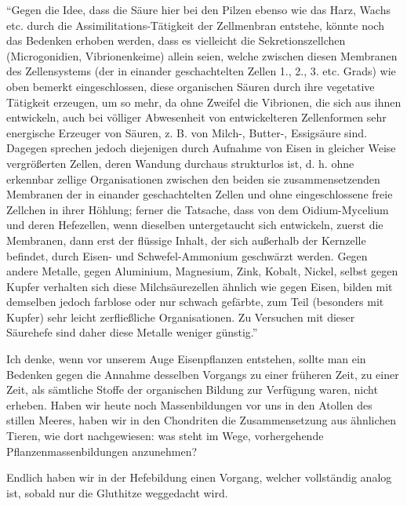 \documentclass[a4paper, 12pt, oneside]{article}
\begin{document}
"`Gegen die Idee, dass die Säure hier bei den Pilzen ebenso wie das Harz, Wachs etc. durch die Assimilitations-Tätigkeit der Zellmenbran entstehe, könnte noch das Bedenken erhoben werden, dass es vielleicht die Sekretionszellchen (Microgonidien, Vibrionenkeime) allein seien, welche zwischen diesen Membranen des Zellensystems (der in einander geschachtelten Zellen 1., 2., 3. etc. Grads) wie oben bemerkt eingeschlossen, diese organischen Säuren durch ihre vegetative Tätigkeit erzeugen, um so mehr, da ohne Zweifel die Vibrionen, die sich aus ihnen entwickeln, auch bei völliger Abwesenheit von entwickelteren Zellenformen sehr energische Erzeuger von Säuren, z. B. von Milch-, Butter-, Essigsäure sind. Dagegen sprechen jedoch diejenigen durch Aufnahme von Eisen in gleicher Weise vergrößerten Zellen, deren Wandung durchaus strukturlos ist, d. h. ohne erkennbar zellige Organisationen zwischen den beiden sie zusammensetzenden Membranen der in einander geschachtelten Zellen und ohne eingeschlossene freie Zellchen in ihrer Höhlung; ferner die Tatsache, dass von dem Oidium-Mycelium und deren Hefezellen, wenn dieselben untergetaucht sich entwickeln, zuerst die Membranen, dann erst der flüssige Inhalt, der sich außerhalb der Kernzelle befindet, durch Eisen- und Schwefel-Ammonium geschwärzt werden. Gegen andere Metalle, gegen Aluminium, Magnesium, Zink, Kobalt, Nickel, selbst gegen Kupfer verhalten sich diese Milchsäurezellen ähnlich wie gegen Eisen, bilden mit demselben jedoch farblose oder nur schwach gefärbte, zum Teil (besonders mit Kupfer) sehr leicht zerfließliche Organisationen. Zu Versuchen mit dieser Säurehefe sind daher diese Metalle weniger günstig."'

Ich denke, wenn vor unserem Auge Eisenpflanzen entstehen, sollte man ein Bedenken gegen die Annahme desselben Vorgangs zu einer früheren Zeit, zu einer Zeit, als sämtliche Stoffe der organischen Bildung zur Verfügung waren, nicht erheben. Haben wir heute noch Massenbildungen vor uns in den Atollen des stillen Meeres, haben wir in den Chondriten die Zusammensetzung aus ähnlichen Tieren, wie dort nachgewiesen: was steht im Wege, vorhergehende Pflanzenmassenbildungen anzunehmen?

Endlich haben wir in der Hefebildung einen Vorgang, welcher vollständig analog ist, sobald nur die Gluthitze weggedacht wird.
\end{document}
